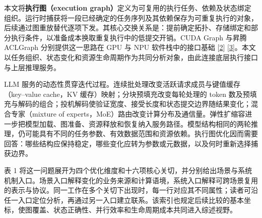 \documentclass[UTF8,10.5pt,fontset=windows]{ctexart}
\begin{document}
本文将\textbf{执行图（execution
graph）}定义为可复用的执行任务、依赖及状态绑定组织。运行时捕获将一段已经确定的任务序列及其依赖保存为可重复执行的对象，后续通过图重放替代逐项下发。其核心交换关系是：提前确定拓扑、存储绑定和部分执行条件，以准备成本换取重复执行中的低提交开销。CUDA
Graph 与昇腾 ACLGraph 分别提供这一思路在 GPU 与 NPU 软件栈中的接口基础
{[}\protect\hyperlink{ref-nvidia2026cuda1303}{2}{]}
{[}\protect\hyperlink{ref-cann900overview}{3}{]}。本文以任务组织、状态变化和资源生命周期作为共同分析对象，由此连接底层执行接口与上层推理服务。

LLM
服务的动态性贯穿迭代过程。连续批处理改变活跃请求成员与键值缓存（key--value
cache，KV 缓存）映射；分块预填充改变每轮处理的 token
数及预填充与解码的组合；投机解码使验证宽度、接受长度和状态提交边界随结果变化；混合专家（mixture
of
experts，MoE）路由改变计算分布及通信量。弹性扩缩容进一步把模型加载、图准备、资源释放和恢复纳入服务路径。模型结构相同的两轮推理，仍可能具有不同的任务参数、有效数据范围和资源依赖。执行图优化因而需要回答：哪些结构应保持稳定，哪些变化应转为参数或元数据，以及何时重新选择捕获边界。

表 1
将这一问题展开为四个优化维度和十六项核心关切，并分别给出场景与系统机制入口。场景入口解释变化的业务来源和计算语境，系统入口解释可跨场景复用的表示与协议。同一工作在多个关切下出现时，每一行对应其不同属性；读者可沿任一入口定位分析，再通过另一入口建立联系。该索引也规定后续比较的基本坐标，使图覆盖、状态正确性、并行效率和生命周期成本共同进入综述视野。
\end{document}
